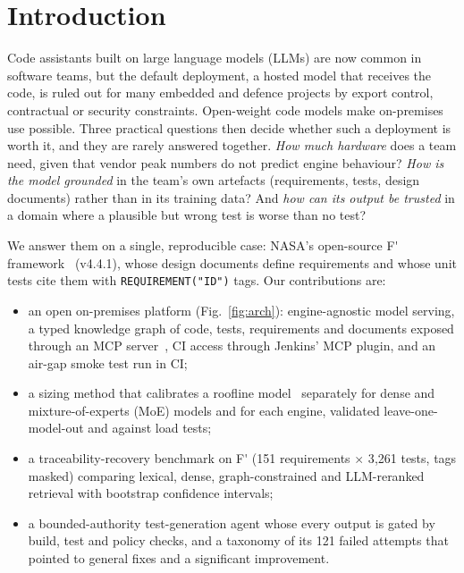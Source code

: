 \documentclass[conference]{IEEEtran}
\newcommand{\Fp}{F\'{}}  %
\newcommand{\tool}[1]{\texttt{#1}}
\begin{document}
\section{Introduction}
Code assistants built on large language models (LLMs) are now common in software teams, but the default
deployment, a hosted model that receives the code, is ruled out for many embedded and defence projects by export
control, contractual or security constraints. Open-weight code models make on-premises use possible. Three
practical questions then decide whether such a deployment is worth it, and they are rarely answered together.
\emph{How much hardware} does a team need, given that vendor peak numbers do not predict engine behaviour?
\emph{How is the model grounded} in the team's own artefacts (requirements, tests, design documents) rather than
in its training data? And \emph{how can its output be trusted} in a domain where a plausible but wrong test is
worse than no test?

We answer them on a single, reproducible case: NASA's open-source \Fp{} framework~\cite{bocchino2018fprime}
(v4.4.1), whose design documents define requirements and whose unit tests cite them with
\tool{REQUIREMENT("ID")} tags. Our contributions are:
\begin{itemize}
\item an open on-premises platform (Fig.~\ref{fig:arch}): engine-agnostic model serving, a typed knowledge graph of
  code, tests, requirements and documents exposed through an MCP server~\cite{mcp2025}, CI access through
  Jenkins' MCP plugin, and an air-gap smoke test run in CI;
\item a sizing method that calibrates a roofline model~\cite{williams2009roofline} separately for dense and
  mixture-of-experts (MoE) models and for each engine, validated leave-one-model-out and against load tests;
\item a traceability-recovery benchmark on \Fp{} (151 requirements $\times$ 3{,}261 tests, tags masked) comparing
  lexical, dense, graph-constrained and LLM-reranked retrieval with bootstrap confidence intervals;
\item a bounded-authority test-generation agent whose every output is gated by build, test and policy checks,
  and a taxonomy of its 121 failed attempts that pointed to general fixes and a significant improvement.
\end{itemize}
\end{document}
